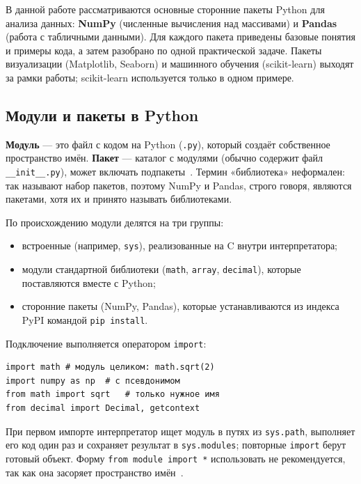 \documentclass[pract]{SCWorks}
\begin{document}
В данной работе рассматриваются основные сторонние пакеты Python для анализа данных: \textbf{NumPy}
(численные вычисления над массивами) и \textbf{Pandas} (работа с табличными данными). Для каждого пакета
приведены базовые понятия и примеры кода, а затем разобрано по одной практической задаче. Пакеты визуализации
(Matplotlib, Seaborn) и машинного обучения (scikit-learn) выходят за рамки работы; scikit-learn используется
только в одном примере.

\subsection{Модули и пакеты в Python}

\textbf{Модуль} --- это файл с кодом на Python (\texttt{.py}), который создаёт собственное пространство имён.
\textbf{Пакет} --- каталог с модулями (обычно содержит файл \texttt{\_\_init\_\_.py}), может включать подпакеты~\cite{python-docs}.
Термин «библиотека» неформален: так называют набор пакетов, поэтому NumPy и Pandas, строго говоря, являются
пакетами, хотя их и принято называть библиотеками.

По происхождению модули делятся на три группы:
\begin{itemize}
    \item встроенные (например, \texttt{sys}), реализованные на C внутри интерпретатора;
    \item модули стандартной библиотеки (\texttt{math}, \texttt{array}, \texttt{decimal}), которые поставляются
    вместе с Python;
    \item сторонние пакеты (NumPy, Pandas), которые устанавливаются из индекса PyPI командой \texttt{pip install}.
\end{itemize}

Подключение выполняется оператором \texttt{import}:

\begin{verbatim}
import math # модуль целиком: math.sqrt(2)
import numpy as np  # с псевдонимом
from math import sqrt   # только нужное имя
from decimal import Decimal, getcontext
\end{verbatim}

При первом импорте интерпретатор ищет модуль в путях из \texttt{sys.path}, выполняет его код один раз и сохраняет
результат в \texttt{sys.modules}; повторные \texttt{import} берут готовый объект. Форму \texttt{from module import *}
использовать не рекомендуется, так как она засоряет пространство имён~\cite{python-docs}.
\end{document}
